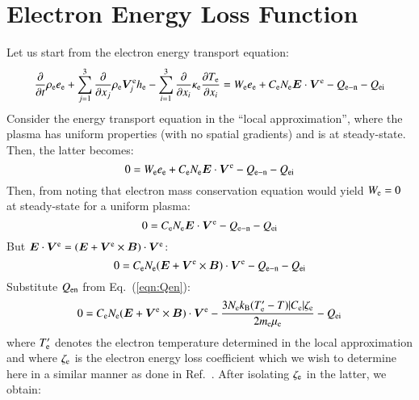 \documentclass{warpdoc}
\renewcommand{\vec}[1]{\bm{#1}}
\begin{document}
%


\section{Electron Energy Loss Function}



Let us start from the electron energy transport equation:
%
\begin{equation}
\frac{\partial }{\partial t}\rho_{\rm e} e_{\rm e} + \sum_{j=1}^3  \frac{\partial }{\partial x_j} \rho_{\rm e} \vec{V}^{\rm e}_j h_{\rm e} 
-\sum_{i=1}^{3}\frac{\partial }{\partial x_i}\kappa_{\rm e}\frac{\partial T_{\rm e}}{\partial x_i}
= 
 W_{\rm e} e_{\rm e}
+   C_{\rm e} N_{\rm e} \vec{E} \cdot \vec{V}^{\rm e}  
- Q_{\rm e-n}
- Q_{\rm ei}
\end{equation}
%
Consider the energy transport equation in the ``local approximation'', where the plasma has uniform properties (with no spatial gradients) and is at steady-state. Then, the latter becomes:
%
\begin{equation}
0
= 
 W_{\rm e} e_{\rm e}
+   C_{\rm e} N_{\rm e} \vec{E} \cdot \vec{V}^{\rm e}  
- Q_{\rm e-n}
- Q_{\rm ei}
\end{equation}
%
Then, from noting that electron mass conservation equation would yield $W_{\rm e}=0$ at steady-state for a uniform plasma:
%
\begin{equation}
0
= 
   C_{\rm e} N_{\rm e} \vec{E} \cdot \vec{V}^{\rm e}  
- Q_{\rm e-n}
- Q_{\rm ei}
\end{equation}
%
But $\vec{E} \cdot \vec{V}^{\rm e}=(\vec{E}+\vec{V}^{\rm e}\times\vec{B}) \cdot \vec{V}^{\rm e}$:
%
\begin{equation}
0
= 
   C_{\rm e} N_{\rm e} (\vec{E}+\vec{V}^{\rm e}\times\vec{B}) \cdot \vec{V}^{\rm e}  
- Q_{\rm e-n}
- Q_{\rm ei}
\end{equation}
%
Substitute $Q_{\rm en}$ from Eq.\ (\ref{eqn:Qen}):
%
\begin{equation}
0
= 
   C_{\rm e} N_{\rm e} (\vec{E}+\vec{V}^{\rm e}\times\vec{B}) \cdot \vec{V}^{\rm e}  
- \frac{3 N_{\rm e}k_{\rm B} (T_{\rm e}^\prime-T)  |C_{\rm e}| \zeta_{\rm e}}{2 m_{\rm e}\mu_{\rm e}}
- Q_{\rm ei}
\end{equation}
%
where $T_{\rm e}^\prime$ denotes the electron temperature determined in the local approximation and where $\zeta_{\rm e}$ is the electron energy loss coefficient which we wish to determine here in a similar manner as done in Ref.\ \cite{misc:1995:boeuf}. After isolating $\zeta_{\rm e}$ in the latter, we obtain:
\end{document}
